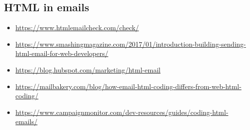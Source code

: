\documentclass{article}
\begin{document}
\subsection{HTML in emails}

\begin{itemize}
  \item \href{https://www.htmlemailcheck.com/check/}{https://www.htmlemailcheck.com/check/}
  \item \href{https://www.smashingmagazine.com/2017/01/introduction-building-sending-html-email-for-web-developers/}{https://www.smashingmagazine.com/2017/01/introduction-building-sending-html-email-for-web-developers/}
  \item \href{https://blog.hubspot.com/marketing/html-email}{https://blog.hubspot.com/marketing/html-email}
  \item \href{https://mailbakery.com/blog/how-email-html-coding-differs-from-web-html-coding/}{https://mailbakery.com/blog/how-email-html-coding-differs-from-web-html-coding/}
  \item \href{https://www.campaignmonitor.com/dev-resources/guides/coding-html-emails/}{https://www.campaignmonitor.com/dev-resources/guides/coding-html-emails/}
\end{itemize}
\end{document}
